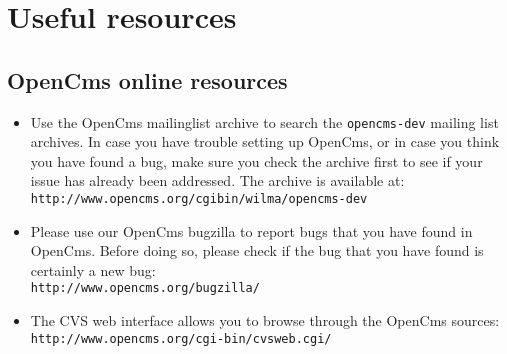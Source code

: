 \chapter{Useful resources}

\section{OpenCms online resources}

\begin{itemize}
\item Use the OpenCms mailinglist archive to search the {\tt opencms-dev} mailing list archives.
In case you have trouble setting up OpenCms, or in case you think you have found a bug,
make sure you check the archive first to see if your issue has already been addressed.
The archive is available at:\\
{\tt http://www.opencms.org/cgibin/wilma/opencms-dev}
\item Please use our OpenCms bugzilla to report bugs that you have found in OpenCms. 
Before doing so, please check if the bug that you have found is certainly a new bug:\\
{\tt http://www.opencms.org/bugzilla/}
\item The CVS web interface allows you to browse through the OpenCms sources:\\
{\tt http://www.opencms.org/cgi-bin/cvsweb.cgi/}
\end{itemize}

